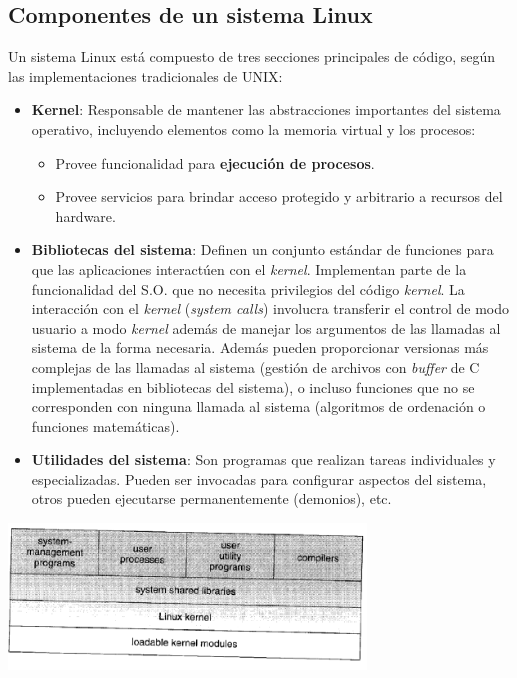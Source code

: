 \documentclass[spanish]{article}
\begin{document}
\subsection{Componentes de un sistema Linux}
Un sistema Linux está compuesto de tres secciones principales de código, según las implementaciones tradicionales de UNIX:
\begin{itemize}
	\item \textbf{Kernel}: Responsable de mantener las abstracciones importantes del sistema operativo, incluyendo elementos como la memoria virtual y los procesos:
	\begin{itemize}
		\item Provee funcionalidad para \textbf{ejecución de procesos}.
		\item Provee servicios para brindar acceso protegido y arbitrario a recursos del hardware.
	\end{itemize}
	\item \textbf{Bibliotecas del sistema}: Definen un conjunto estándar de funciones para que las aplicaciones interactúen con el \textit{kernel}. Implementan parte de la funcionalidad del S.O. que no necesita privilegios del código \textit{kernel}. La interacción con el \textit{kernel} (\textit{system calls}) involucra transferir el control de modo usuario a modo \textit{kernel} además de manejar los argumentos de las llamadas al sistema de la forma necesaria. Adem\'{a}s pueden proporcionar versionas m\'{a}s complejas de las llamadas al sistema (gesti\'{o}n de archivos con \textit{buffer} de C implementadas en bibliotecas del sistema), o incluso funciones que no se corresponden con ninguna llamada al sistema (algoritmos de ordenaci\'{o}n o funciones matem\'{a}ticas). 
	\item \textbf{Utilidades del sistema}: Son programas que realizan tareas individuales y especializadas. Pueden ser invocadas para configurar aspectos del sistema, otros pueden ejecutarse permanentemente (demonios), etc. 
\end{itemize}
\begin{center}
\includegraphics[width=9.5cm]{img/components.png}
\end{center}
\end{document}
